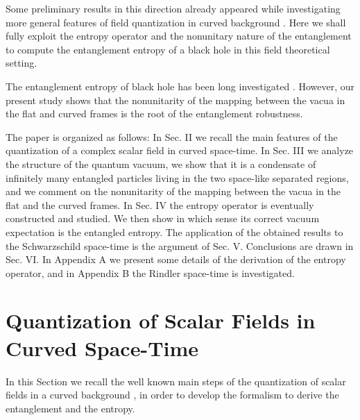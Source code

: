 \noindent Some preliminary results in this direction already
appeared while investigating more general features of field
quantization in curved background
\cite{Martellini:sm,Iorio:2001te}. Here we shall fully exploit the
entropy operator and the nonunitary nature of the entanglement to
compute the entanglement entropy of a black hole in this field
theoretical setting.

\noindent The entanglement entropy of black hole has been long
investigated
\cite{Bombelli:1986rw,Mukohyama:1996yi,Terashima:1999vw,frolov1}.
However, our present study shows that the nonunitarity of the
mapping between the vacua in the flat and curved frames is the
root of the entanglement robustness.

\noindent The paper is organized as follows: In Sec. II we recall
the main features of the quantization of a complex scalar field in
curved space-time. In Sec. III we analyze the structure of the
quantum vacuum, we show that it is a condensate of infinitely many
entangled particles living in the two space-like separated
regions, and we comment on the nonunitarity of the mapping
between the vacua in the flat and the curved frames. In Sec. IV
the entropy operator is eventually constructed and studied. We
then show in which sense its correct vacuum expectation is the
entangled entropy. The application of the obtained results to the
Schwarzschild space-time is the argument of Sec. V. Conclusions
are drawn in Sec. VI. In Appendix A we present some details of
the derivation of the entropy operator, and in Appendix B the
Rindler space-time is investigated.

\section{Quantization of Scalar Fields in Curved Space-Time}
\setcounter{equation}{0}

\noindent In this Section we recall the well known main steps of
the quantization of scalar fields in a curved background
\cite{birrell,HAW,Davies:1974th,Unruh:db,TAK,Martellini:sm,Iorio:2001te},
in order to develop the formalism to derive the entanglement and
the entropy.

